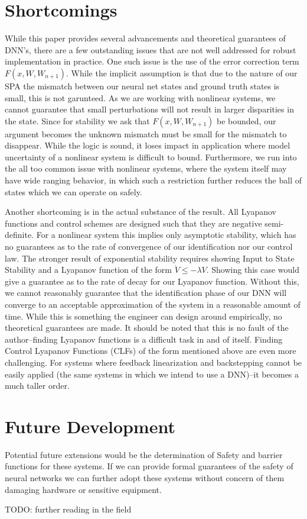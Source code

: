 \documentclass[12pt, letterpaper]{article}
\begin{document}
	
	
	
	\section{Shortcomings}
	While this paper provides several advancements and theoretical guarantees of DNN's, there are a few outstanding issues that are not well addressed for robust implementation in practice. One such issue is the use of the error correction term $F(x,W,W_{n+1})$. While the implicit assumption is that due to the nature of our SPA the mismatch between our neural net states and ground truth states is small, this is not garunteed. As we are working with nonlinear systems, we cannot guarantee that small perturbations will not result in larger disparities in the state. Since for stability we ask that $F(x,W,W_{n+1})$ be bounded, our argument becomes the unknown mismatch must be small for the mismatch to disappear. While the logic is sound, it loses impact in application where model uncertainty of a nonlinear system is difficult to bound. Furthermore, we run into the all too common issue with nonlinear systems, where the system itself may have wide ranging behavior, in which such a restriction further reduces the ball of states which we can operate on safely.
	
	Another shortcoming is in the actual substance of the result. All Lyapanov functions and control schemes are designed such that they are negative semi-definite. For a nonlinear system this implies only asymptotic stability, which has no guarantees as to the rate of convergence of our identification nor our control law. The stronger result of exponential stability requires showing Input to State Stability and a Lyapanov function of the form $\dot{V} \leq -\lambda V$. Showing this case would give a guarantee as to the rate of decay for our Lyapanov function. Without this, we cannot reasonably guarantee that the identification phase of our DNN will converge to an acceptable approximation of the system in a reasonable amount of time. While this is something the engineer can design around empirically, no theoretical guarantees are made. It should be noted that this is no fault of the author--finding Lyapanov functions is a difficult task in and of itself. Finding Control Lyapanov Functions (CLFs) of the form mentioned above are even more challenging. For systems where feedback linearization and backstepping cannot be easily applied (the same systems in which we intend to use a DNN)--it becomes a much taller order. 
	


	\section{Future Development}

	Potential future extensions would be the determination of Safety and barrier functions for these systems. If we can provide formal guarantees of the safety of neural networks we can further adopt these systems without concern of them damaging hardware or sensitive equipment. 
	
	TODO: further reading in the field
	
	
		\nocite{*}
\end{document}
